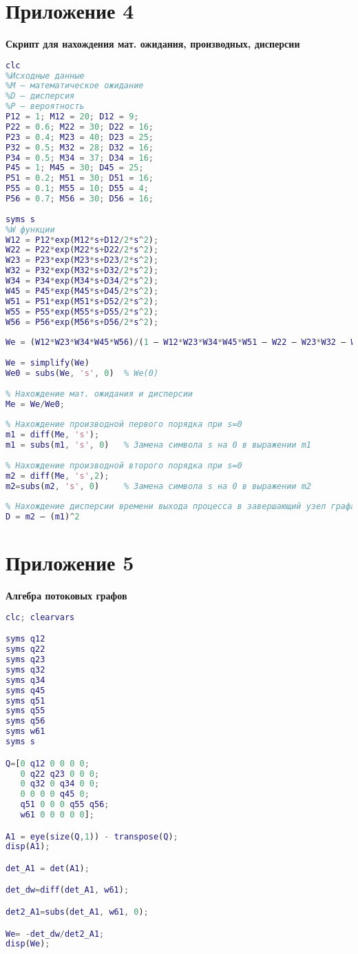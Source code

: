 \section*{Приложение 4}
\textbf{Скрипт для нахождения мат. ожидания, производных, дисперсии}
\begin{lstlisting}[language={matlab}, caption={Код Matlab}]
clc
%Исходные данные
%М — математическое ожидание
%D — дисперсия
%P — вероятность
P12 = 1; M12 = 20; D12 = 9; 
P22 = 0.6; M22 = 30; D22 = 16; 
P23 = 0.4; M23 = 40; D23 = 25; 
P32 = 0.5; M32 = 28; D32 = 16; 
P34 = 0.5; M34 = 37; D34 = 16; 
P45 = 1; M45 = 30; D45 = 25; 
P51 = 0.2; M51 = 30; D51 = 16; 
P55 = 0.1; M55 = 10; D55 = 4; 
P56 = 0.7; M56 = 30; D56 = 16; 
 
syms s
%W функции
W12 = P12*exp(M12*s+D12/2*s^2);
W22 = P22*exp(M22*s+D22/2*s^2);
W23 = P23*exp(M23*s+D23/2*s^2);
W32 = P32*exp(M32*s+D32/2*s^2);
W34 = P34*exp(M34*s+D34/2*s^2);
W45 = P45*exp(M45*s+D45/2*s^2);
W51 = P51*exp(M51*s+D52/2*s^2);
W55 = P55*exp(M55*s+D55/2*s^2);
W56 = P56*exp(M56*s+D56/2*s^2);
 
We = (W12*W23*W34*W45*W56)/(1 — W12*W23*W34*W45*W51 — W22 — W23*W32 — W55+W22*W55+W55*W23*W32);
 
We = simplify(We)
We0 = subs(We, 's', 0)  % We(0)
 
% Нахождение мат. ожидания и дисперсии
Me = We/We0;
 
% Нахождение производной первого порядка при s=0
m1 = diff(Me, 's');     
m1 = subs(m1, 's', 0)   % Замена символа s на 0 в выражении m1
 
% Нахождение производной второго порядка при s=0
m2 = diff(Me, 's',2);
m2=subs(m2, 's', 0)     % Замена символа s на 0 в выражении m2
 
% Нахождение дисперсии времени выхода процесса в завершающий узел графа
D = m2 — (m1)^2
\end{lstlisting}

\section*{Приложение 5}
\textbf{Алгебра потоковых графов}
\begin{lstlisting}[language={matlab}, caption={Matlab скрипт}, basicstyle=\ttfamily]
clc; clearvars

syms q12
syms q22
syms q23
syms q32
syms q34
syms q45
syms q51
syms q55
syms q56
syms w61
syms s

Q=[0 q12 0 0 0 0;
   0 q22 q23 0 0 0;
   0 q32 0 q34 0 0;
   0 0 0 0 q45 0;
   q51 0 0 0 q55 q56;
   w61 0 0 0 0 0];

A1 = eye(size(Q,1)) - transpose(Q);
disp(A1);

det_A1 = det(A1);

det_dw=diff(det_A1, w61);

det2_A1=subs(det_A1, w61, 0);

We= -det_dw/det2_A1;
disp(We);
\end{lstlisting}


